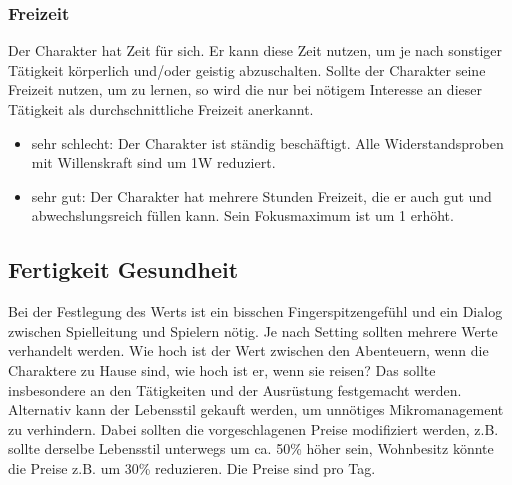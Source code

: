 \documentclass{article}
\begin{document}
\subsubsection{Freizeit}

Der Charakter hat Zeit für sich. Er kann diese Zeit nutzen, um je nach sonstiger Tätigkeit körperlich und/oder geistig
abzuschalten. Sollte der Charakter seine Freizeit nutzen, um zu lernen, so wird die nur bei nötigem Interesse an dieser
Tätigkeit als durchschnittliche Freizeit anerkannt.

\begin{itemize}
\item sehr schlecht: Der Charakter ist ständig beschäftigt. Alle Widerstandsproben mit Willenskraft sind um 1W reduziert.
\item sehr gut: Der Charakter hat mehrere Stunden Freizeit, die er auch gut und abwechslungsreich füllen kann. Sein Fokusmaximum ist um 1 erhöht.
\end{itemize}

\begin{center}
\subsection{Fertigkeit Gesundheit}
\end{center}

Bei der Festlegung des Werts ist ein bisschen Fingerspitzengefühl und ein Dialog zwischen Spielleitung und Spielern
nötig. Je nach Setting sollten mehrere Werte verhandelt werden. Wie hoch ist der Wert zwischen den Abenteuern, wenn
die Charaktere zu Hause sind, wie hoch ist er, wenn sie reisen? Das sollte insbesondere an den Tätigkeiten und der
Ausrüstung festgemacht werden. Alternativ kann der Lebensstil gekauft werden, um unnötiges Mikromanagement zu
verhindern. Dabei sollten die vorgeschlagenen Preise modifiziert werden, z.B. sollte derselbe Lebensstil unterwegs um
ca. 50\% höher sein, Wohnbesitz könnte die Preise z.B. um 30\% reduzieren. Die Preise sind pro Tag.
\end{document}
